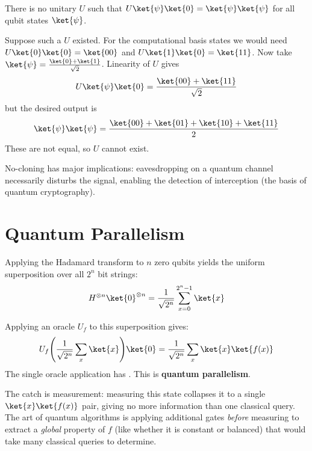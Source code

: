 \documentclass[oneside]{academica}
\begin{document}
\begin{theorem*}[No-cloning]
  There is no unitary $U$ such that $U\ket{\psi}\ket{0}=\ket{\psi}\ket{\psi}$ for all qubit states $\ket{\psi}$.
\end{theorem*}

\begin{proof*}
  Suppose such a $U$ existed.
  For the computational basis states we would need $U\ket{0}\ket{0}=\ket{00}$ and $U\ket{1}\ket{0}=\ket{11}$.
  Now take $\ket{\psi}=\frac{\ket{0}+\ket{1}}{\sqrt{2}}$.
  Linearity of $U$ gives
  \begin{equation*}
    U\ket{\psi}\ket{0}=\frac{\ket{00}+\ket{11}}{\sqrt{2}}
  \end{equation*}
  but the desired output is
  \begin{equation*}
    \ket{\psi}\ket{\psi}=\frac{\ket{00}+\ket{01}+\ket{10}+\ket{11}}{2}
  \end{equation*}
  These are not equal, so $U$ cannot exist.
\end{proof*}

No-cloning has major implications: eavesdropping on a quantum channel necessarily disturbs the signal, enabling the detection of interception (the basis of quantum cryptography).

\section{Quantum Parallelism}

Applying the Hadamard transform to $n$ zero qubits yields the uniform superposition over all $2^n$ bit strings:
\begin{equation*}
  H^{\otimes n}\ket{0}^{\otimes n}=\frac{1}{\sqrt{2^n}}\sum_{x=0}^{2^n-1}\ket{x}
\end{equation*}

Applying an oracle $U_f$ to this superposition gives:
\begin{equation*}
  U_f\!\left(\frac{1}{\sqrt{2^n}}\sum_x\ket{x}\right)\!\ket{0} =\frac{1}{\sqrt{2^n}}\sum_x\ket{x}\ket{f(x)}
\end{equation*}
The single oracle application has .
This is \textbf{quantum parallelism}.

\begin{note}
  The catch is measurement: measuring this state collapses it to a single $\ket{x}\ket{f(x)}$ pair, giving no more information than one classical query.
  The art of quantum algorithms is applying additional gates \emph{before} measuring to extract a \emph{global} property of $f$ (like whether it is constant or balanced) that would take many classical queries to determine.
\end{note}
\end{document}
